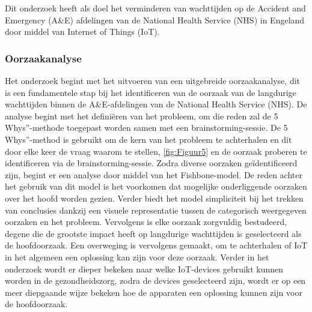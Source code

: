 


Dit onderzoek heeft als doel het verminderen van wachttijden op de Accident and Emergency (A\&E) afdelingen van de National Health Service (NHS) in Engeland door middel van Internet of Things (IoT).


\subsubsection*{Oorzaakanalyse}
Het onderzoek begint met het uitvoeren van een uitgebreide oorzaakanalyse, dit is een fundamentele stap bij het identificeren van de oorzaak van de langdurige wachttijden binnen de A\&E-afdelingen van de National Health Service (NHS). De analyse begint met het definiëren van het probleem, om die reden zal de 5 Whys”-methode toegepast worden samen met een brainstorming-sessie. De 5 Whys”-method is gebruikt om de kern van het probleem te achterhalen en dit door elke keer de vraag waarom te stellen, \ref{fig:Figuur5} en de oorzaak proberen te identificeren via de brainstorming-sessie. Zodra diverse oorzaken geïdentificeerd zijn, begint er een analyse door middel van het Fishbone-model. De reden achter het gebruik van dit model is het voorkomen dat mogelijke onderliggende oorzaken over het hoofd worden gezien. Verder biedt het model simpliciteit bij het trekken van conclusies dankzij een visuele representatie tussen de categorisch weergegeven oorzaken en het probleem. Vervolgens is elke oorzaak zorgvuldig bestudeerd, degene die de grootste impact heeft op langdurige wachttijden is geselecteerd als de hoofdoorzaak. Een overweging is vervolgens gemaakt, om te achterhalen of IoT in het algemeen een oplossing kan zijn voor deze oorzaak. Verder in het onderzoek wordt er dieper bekeken naar welke IoT-devices gebruikt kunnen worden in de gezondheidszorg, zodra de devices geselecteerd zijn, wordt er op een meer diepgaande wijze bekeken hoe de apparaten een oplossing kunnen zijn voor de hoofdoorzaak.

